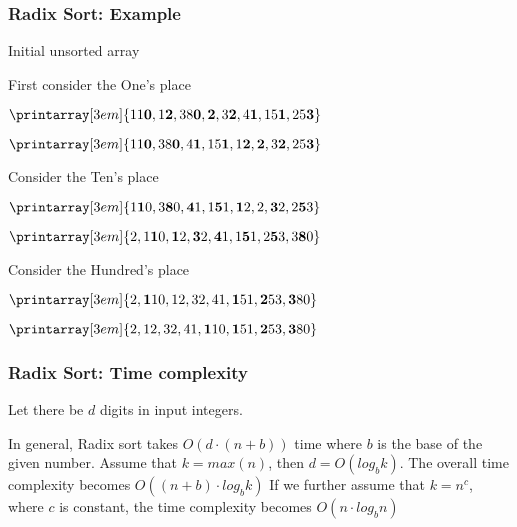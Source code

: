 \documentclass[newPxFont,sthlmFooter,nooffset]{beamer}
\begin{document}
\begin{frame}[t]
  \frametitle{Radix Sort: Example}

Initial unsorted array

  \begin{center}
  \end{center}

First consider the One's place
  \begin{center}
$    \printarray[3em]{11\mathbf{0}, 1\mathbf{2}, 38\mathbf{0}, \mathbf{2}, 3\mathbf{2}, 4\mathbf{1}, 15\mathbf{1}, 25\mathbf{3}}$

$    \printarray[3em]{11\mathbf{0}, 38\mathbf{0}, 4\mathbf{1},  15\mathbf{1}, 1\mathbf{2}, \mathbf{2}, 3\mathbf{2},  25\mathbf{3}}$

  \end{center}

Consider the Ten's place
  \begin{center}
$    \printarray[3em]{1\mathbf{1}0, 3\mathbf{8}0, \mathbf{4}1, 1\mathbf{5}1, \mathbf{1}2,  2, \mathbf{3}2,   2\mathbf{5}3}$

$    \printarray[3em]{2, 1\mathbf{1}0, \mathbf{1}2, \mathbf{3}2,  \mathbf{4}1, 1\mathbf{5}1,      2\mathbf{5}3, 3\mathbf{8}0}$

  \end{center}

Consider the Hundred's place
  \begin{center}
$    \printarray[3em]{2, \mathbf{1}10, 12, 32,  41, \mathbf{1}51,      \mathbf{2}53, \mathbf{3}80}$

$    \printarray[3em]{2,  12, 32,  41, \mathbf{1}10, \mathbf{1}51,      \mathbf{2}53, \mathbf{3}80}$

  \end{center}


\end{frame}

\begin{frame}[t]
  \frametitle{Radix Sort: Time complexity}
Let there be $d$ digits in input integers.

In general, Radix sort takes $O(d\cdot (n+b))$ time where $b$ is the base of the given number.
\bigskip
Assume that $k = max(n)$, then $d = O(log_bk)$. The overall time complexity becomes $O((n+b)\cdot log_bk)$
\bigskip
If we further assume that $k = n^c$, where $c$ is constant, the time complexity becomes $O(n\cdot log_bn)$
\end{frame}
\end{document}
